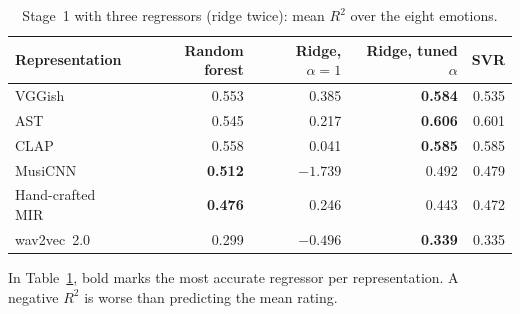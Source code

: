 \begin{table}[H]
  \centering
  \caption{Stage~1 with three regressors (ridge twice): mean $R^2$ over the eight emotions.}
  \label{tab:app_stage1_regressors}
  \begin{tabular}{lrrrr}
    \toprule
    Representation & Random forest & Ridge, $\alpha=1$ & Ridge, tuned $\alpha$ & SVR \\
    \midrule
    VGGish & 0.553 & 0.385 & \textbf{0.584} & 0.535 \\
    AST & 0.545 & 0.217 & \textbf{0.606} & 0.601 \\
    CLAP & 0.558 & 0.041 & \textbf{0.585} & 0.585 \\
    MusiCNN & \textbf{0.512} & $-1.739$ & 0.492 & 0.479 \\
    Hand-crafted MIR & \textbf{0.476} & 0.246 & 0.443 & 0.472 \\
    wav2vec~2.0 & 0.299 & $-0.496$ & \textbf{0.339} & 0.335 \\
    \bottomrule
  \end{tabular}
\end{table}

In Table~\ref{tab:app_stage1_regressors}, bold marks the most accurate regressor per
representation. A negative $R^2$ is worse than predicting the mean rating.

